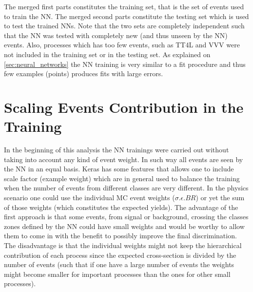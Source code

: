 The merged first parts constitutes the training set, that is the set of events used to train the NN. The merged second parts constitute the testing set which is used to test the trained NNs. Note that the two sets are completely independent such that the NN was tested with completely new (and thus unseen by the NN) events. Also, processes which has too few events, such as TT4L and VVV were not included in the training set or in the testing set. As explained on \ref{sec:neural_networks} the NN training is very similar to a fit procedure and thus few examples (points) produces fits with large errors.

\section{Scaling Events Contribution in the Training}
\label{subsec:scale_train}
In the beginning of this analysis the NN trainings were carried out without taking into account any kind of event weight. In such way all events are seen by the NN in an equal basis. Keras has some features that allows one to include scale factor (example weight) which are in general used to balance the training when the number of events from different classes are very different. In the physics scenario one could use the individual MC event weights ($\sigma.\epsilon.BR$) or yet the sum of those weights (which constitutes the expected yields). The advantage of the first approach is that some events, from signal or background, crossing the classes zones defined by the NN could have small weights and would be worthy to allow them to come in with the benefit to possibly improve  the final discrimination. The disadvantage is that the individual weights might not keep the hierarchical contribution of each process since the expected cross-section is divided by the number of events (such that if one have a large number of events the weights might become smaller for important processes than the ones for other small processes).

